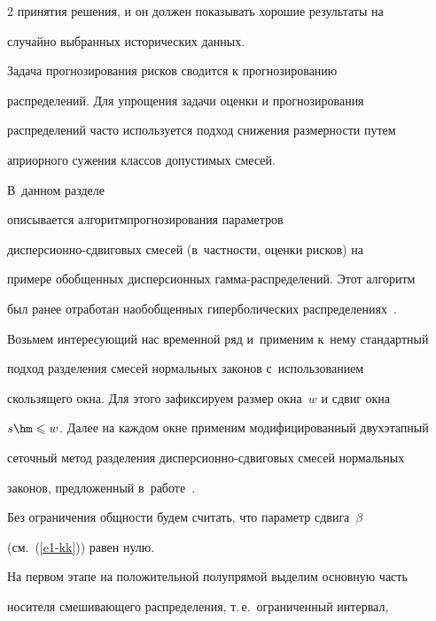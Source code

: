 \begin{multicols}{2}
принятия решения, и он должен показывать хорошие результаты на


случайно выбранных исторических данных.





Задача прогнозирования рисков сводится к прогнозированию


распределений. Для упрощения задачи оценки и прогнозирования


распределений час\-то используется подход снижения размерности путем


априорного сужения классов допустимых смесей. 


%


В~данном разделе


описывается алгоритм\linebreak прогнозирования параметров


дис\-пер\-си\-он\-но-сдви\-го\-вых смесей (в~част\-ности, оценки рисков) на\linebreak


примере обобщенных дисперсионных гам\-ма-рас\-пре\-де\-ле\-ний. Этот алгоритм


был ранее отработан на\linebreak обобщенных гиперболических распределениях~\cite{KorolevKorchagin2015}.





Возьмем интересующий нас временной ряд и~применим к~нему стандартный


подход разделения смесей нормальных законов с~использованием


скользящего окна. Для этого зафиксируем размер окна~$w$ и сдвиг окна


$s\hm\leqslant w$. Далее на каждом окне применим модифицированный двухэтапный


сеточный метод разделения дис\-пер\-си\-он\-но-сдви\-го\-вых смесей нормальных


законов, предложенный в~работе~\cite{kk2014}.





Без ограничения общности будем считать, что параметр сдвига~$\beta$


(см.~(\ref{e1-kk})) равен нулю.





На первом этапе на положительной полупрямой выделим основную часть


носителя смешивающего распределения, т.\,е.\ ограниченный интервал,



\end{multicols}
